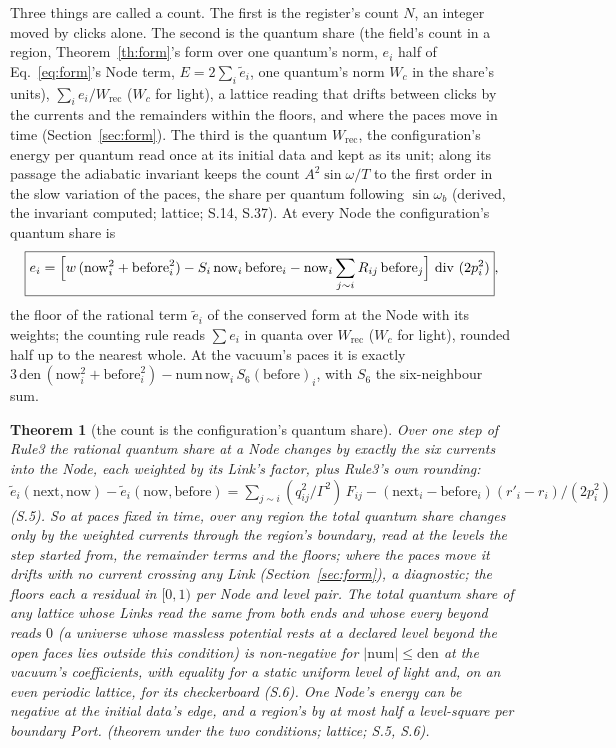 \documentclass[pdflatex,sn-mathphys-num]{sn-jnl}
\newcommand{\num}{\mathrm{num}}
\newcommand{\den}{\mathrm{den}}
\newcommand{\ddiv}{\ \mathrm{div}\ }
\newcommand{\Wc}{W_c}
\theoremstyle{thmstyleone}
\newtheorem{theorem}{Theorem}
\theoremstyle{thmstyletwo}
\begin{document}
Three things are called a count. The first is the register's count $N$, an integer moved by clicks alone. The second is the quantum share (the field's count in a region, Theorem~\ref{th:form}'s form over one quantum's norm, $e_i$ half of Eq.~\eqref{eq:form}'s Node term, $E = 2\sum_i \tilde e_i$, one quantum's norm $\Wc$ in the share's units), $\sum_i e_i / W_{\mathrm{rec}}$ ($\Wc$ for light), a lattice reading that drifts between clicks by the currents and the remainders within the floors, and where the paces move in time (Section~\ref{sec:form}). The third is the quantum $W_{\mathrm{rec}}$, the configuration's energy per quantum read once at its initial data and kept as its unit; along its passage the adiabatic invariant keeps the count $A^2\sin\omega / T$ to the first order in the slow variation of the paces, the share per quantum following $\sin\omega_b$ (derived, the invariant computed; lattice; S.14, S.37). At every Node the configuration's quantum share is
\begin{equation}\label{eq:share}
\boxed{e_i = \Bigl[w\,(\mathrm{now}_i^2 + \mathrm{before}_i^2) - S_i\,\mathrm{now}_i\,\mathrm{before}_i - \mathrm{now}_i \sum_{j \sim i} R_{ij}\,\mathrm{before}_j\Bigr] \ddiv (2p_i^2)},
\end{equation}
the floor of the rational term $\tilde e_i$ of the conserved form at the Node with its weights; the counting rule reads $\sum e_i$ in quanta over $W_{\mathrm{rec}}$ ($\Wc$ for light), rounded half up to the nearest whole. At the vacuum's paces it is exactly $3\,\den\,(\mathrm{now}_i^2 + \mathrm{before}_i^2) - \num\,\mathrm{now}_i\,S_6(\mathrm{before})_i$, with $S_6$ the six-neighbour sum.

\begin{theorem}[the count is the configuration's quantum share]\label{th:share}
Over one step of Rule3 the rational quantum share at a Node changes by exactly the six currents into the Node, each weighted by its Link's factor, plus Rule3's own rounding: $\tilde e_i(\mathrm{next}, \mathrm{now}) - \tilde e_i(\mathrm{now}, \mathrm{before}) = \sum_{j \sim i} (q_{ij}^2 / \Gamma^2)\,F_{ij} - (\mathrm{next}_i - \mathrm{before}_i)(r'_i - r_i) / (2p_i^2)$ (S.5). So at paces fixed in time, over any region the total quantum share changes only by the weighted currents through the region's boundary, read at the levels the step started from, the remainder terms and the floors; where the paces move it drifts with no current crossing any Link (Section~\ref{sec:form}), a diagnostic; the floors each a residual in $[0, 1)$ per Node and level pair. The total quantum share of any lattice whose Links read the same from both ends and whose every beyond reads $0$ (a universe whose massless potential rests at a declared level beyond the open faces lies outside this condition) is non-negative for $|\num| \le \den$ at the vacuum's coefficients, with equality for a static uniform level of light and, on an even periodic lattice, for its checkerboard (S.6). One Node's energy can be negative at the initial data's edge, and a region's by at most half a level-square per boundary Port. (theorem under the two conditions; lattice; S.5, S.6).
\end{theorem}
\end{document}

